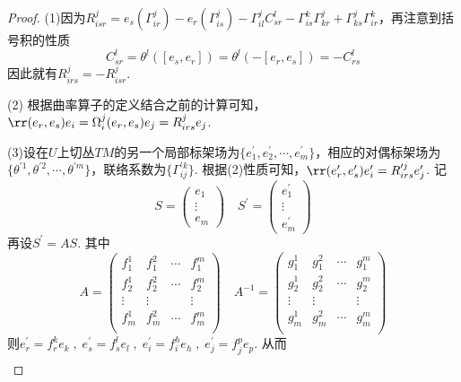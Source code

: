 \begin{proof}
	(1)\;因为$R^{j}_{isr}= e_{s}(\Gamma^{j}_{ir})-e_{r}(\Gamma^{j}_{is})-\Gamma^{j}_{il} C^{l}_{sr}  - \Gamma^{k}_{is}\Gamma_{kr}^{j}+\Gamma^{j}_{ks}\Gamma^{k}_{ir}$，再注意到括号积的性质
	\[
	C_{sr}^{l}=\theta^{l}\left([e_{s},e_{r}]\right) =\theta^{l}\left(-[e_{r},e_{s}]\right)=-C_{rs}^{l}
	\]
	因此就有$R^{j}_{irs}=-R^{j}_{isr}$.
	
	(2)\; 根据曲率算子的定义结合之前的计算可知，$\rr(e_{r},e_{s})e_{i}=\Omega_{i}^{j}(e_{r},e_{s})e_{j}=R^{j}_{irs}e_{j}$. 
	
	(3)\;设在$U$上切丛$TM$的另一个局部标架场为$\{e^{\prime}_{1},e^{\prime}_{2},\cdots,e^{\prime}_{m} \}$，相应的对偶标架场为$\{\theta^{\prime1},\theta^{\prime2},\cdots,\theta^{\prime m} \}$，联络系数为$\{\Gamma^{\prime k}_{ij}\}$. 根据(2)性质可知，$\rr(e^{\prime}_{r},e^{\prime}_{s})e^{\prime}_{i}=R^{\prime j}_{irs}e^{\prime}_{j}$. 记
	\[
	S=\left( \begin{array}{ccc}{e_{1}} \\ {\vdots}  \\ {e_{m}} \end{array}\right)\quad S^{\prime}=\left( \begin{array}{ccc}{e^{\prime}_{1}} \\ {\vdots}  \\ {e^{\prime}_{m}} \end{array}\right)
	\]
	再设$S^{\prime}=AS$. 其中
	\[
	A=\left( \begin{array}{cccc}{f_{1}^{1}} & {f_{1}^{2}}&{\cdots}&{f_{1}^{m}}\\ {f_{2}^{1}} & {f_{2}^{2}}&{\cdots}&{f_{2}^{m}}\\ {\vdots} & {\vdots}&{ }&{\vdots}\\{f_{m}^{1}} & {f_{m}^{2}}&{\cdots}&{f_{m}^{m}}\\ \end{array}\right)\quad A^{-1}=\left( \begin{array}{cccc}{g_{1}^{1}} & {g_{1}^{2}}&{\cdots}&{g_{1}^{m}}\\ {g_{2}^{1}} & {g_{2}^{2}}&{\cdots}&{g_{2}^{m}}\\ {\vdots} & {\vdots}&{ }&{\vdots}\\{g_{m}^{1}} & {g_{m}^{2}}&{\cdots}&{g_{m}^{m}}\\ \end{array}\right)
	\]
	则$e^{\prime}_{r}=f^{k}_{r}e_{k}\;,\;e^{\prime}_{s}=f^{l}_{s}e_{l}\;,\;e^{\prime}_{i}=f^{h}_{i}e_{h}\;,\;e^{\prime}_{j}=f^{p}_{j}e_{p}$. 从而
	\[
	\begin{split}

\end{split}\]
\end{proof}
